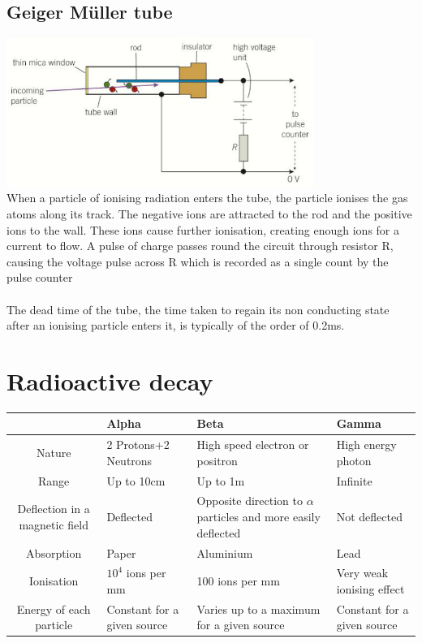 \documentclass{article}[18pt]
\begin{document}
\subsection{Geiger M\"{u}ller tube}
\includegraphics[width=10cm]{geiger.png}\\
When a particle of ionising radiation enters the tube, the particle ionises the gas atoms along its track. The negative ions are attracted to the rod and the positive ions to the wall. These ions cause further ionisation, creating enough ions for a current to flow. A pulse of charge passes round the circuit through resistor R, causing the voltage pulse across R which is recorded as a single count by the pulse counter\\
\\
The dead time of the tube, the time taken to regain its non conducting state after an ionising particle enters it, is typically of the order of 0.2ms.\\
\section{Radioactive decay}
\begin{tabularx}{\textwidth}{|c|X|X|X|}
\hline
&Alpha&Beta&Gamma\\
\hline
Nature&2 Protons+2 Neutrons&High speed electron or positron&High energy photon\\
\hline
Range&Up to 10cm&Up to 1m&Infinite\\
\hline 
Deflection in a magnetic field&Deflected&Opposite direction to $\alpha$ particles and more easily deflected&Not deflected\\
\hline
Absorption&Paper&Aluminium&Lead \\
\hline
Ionisation&$10^4$ ions per mm&100 ions per mm&Very weak ionising effect\\
\hline
Energy of each particle&Constant for a given source&Varies up to a maximum for a given source&Constant for a given source\\
\hline
\end{tabularx}
\newpage
\end{document}
